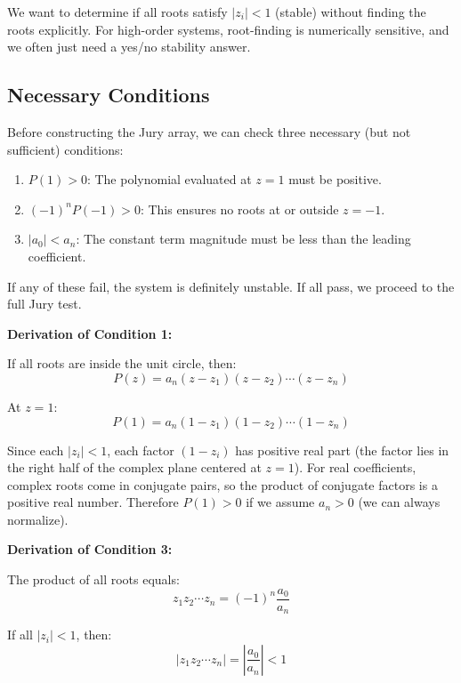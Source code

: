 We want to determine if all roots satisfy $|z_i| < 1$ (stable) without finding the roots explicitly. For high-order systems, root-finding is numerically sensitive, and we often just need a yes/no stability answer.

\subsection{Necessary Conditions}

Before constructing the Jury array, we can check three necessary (but not sufficient) conditions:

\begin{enumerate}
    \item $P(1) > 0$: The polynomial evaluated at $z = 1$ must be positive.
    \item $(-1)^n P(-1) > 0$: This ensures no roots at or outside $z = -1$.
    \item $|a_0| < a_n$: The constant term magnitude must be less than the leading coefficient.
\end{enumerate}

If any of these fail, the system is definitely unstable. If all pass, we proceed to the full Jury test.

\textbf{Derivation of Condition 1:}

If all roots are inside the unit circle, then:
\begin{equation}
P(z) = a_n(z - z_1)(z - z_2) \cdots (z - z_n)
\end{equation}

At $z = 1$:
\begin{equation}
P(1) = a_n(1 - z_1)(1 - z_2) \cdots (1 - z_n)
\end{equation}

Since each $|z_i| < 1$, each factor $(1 - z_i)$ has positive real part (the factor lies in the right half of the complex plane centered at $z = 1$). For real coefficients, complex roots come in conjugate pairs, so the product of conjugate factors is a positive real number. Therefore $P(1) > 0$ if we assume $a_n > 0$ (we can always normalize).

\textbf{Derivation of Condition 3:}

The product of all roots equals:
\begin{equation}
z_1 z_2 \cdots z_n = (-1)^n \frac{a_0}{a_n}
\end{equation}

If all $|z_i| < 1$, then:
\begin{equation}
|z_1 z_2 \cdots z_n| = \left|\frac{a_0}{a_n}\right| < 1
\end{equation}

